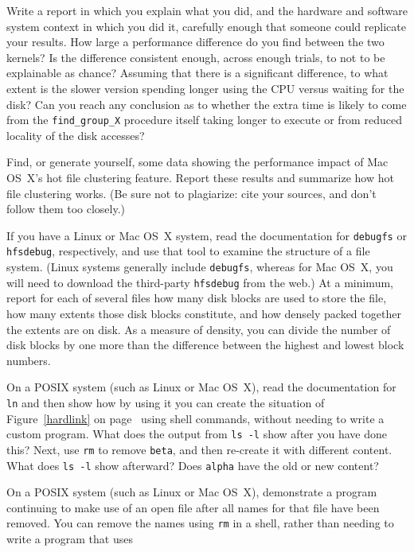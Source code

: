 \begin{chapterEnumerate}
Write a report in which you explain what you did, and the hardware and
software system context in which you did it, carefully enough that
someone could replicate your results.  How large a performance
difference do you find between the two kernels?  Is the
difference consistent enough, across enough trials, to not to be
explainable as chance?  Assuming that there is a significant difference,
to what extent is the slower version spending longer using the CPU versus waiting for the disk?  Can you reach any conclusion as to whether the extra time is likely to come from the \verb|find_group_X| procedure itself taking longer to execute or from reduced locality of the disk accesses?
\item
Find, or generate yourself, some data showing the performance impact
of Mac OS~X's hot file clustering feature.  Report these results and
summarize how hot file clustering works.  (Be sure not to plagiarize:
cite your sources, and don't follow them too closely.)
\item
If you have a Linux or Mac OS~X system, read the documentation for
\verb|debugfs| or \verb|hfsdebug|, respectively, and use that tool to
examine the structure of a file system.  (Linux systems generally
include \verb|debugfs|, whereas for Mac OS~X, you will need
to download the third-party \verb|hfsdebug| from the web.)  At a
minimum, report for each of several files how many disk blocks are
used to store the file, how many extents those disk blocks constitute,
and how densely packed together the extents are on disk.  As a
measure of density, you can divide the number of disk blocks by one
more than the
difference between the highest and lowest block numbers.
\item\label{ln-project}
On a POSIX system (such as Linux or Mac OS~X), read the documentation
for \verb|ln| and then show how by using it you can create the situation
of Figure~\ref{hardlink} on page~\pageref{hardlink} using shell commands, without needing to
write a custom program.  What does the output from \verb|ls -l| show
after you have done this?  Next, use \verb|rm| to remove \verb|beta|,
and then re-create it with different content.  What does \verb|ls -l|
show afterward?  Does \verb|alpha| have the old or new content?
\item\label{unlinked-file-project}
On a POSIX system (such as Linux or Mac OS~X), demonstrate a program
continuing to make use of an open file after all names for that file
have been removed.  You can remove the names using \verb|rm| in a
shell, rather than needing to write a program that uses

\end{chapterEnumerate}
